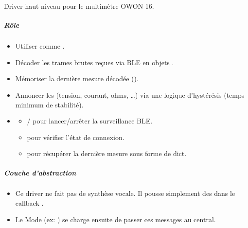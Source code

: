 \documentclass[letterpaper,10pt,french]{sphinxmanual}
\begin{document}
\begin{fulllineitems}
\sphinxAtStartPar
Driver haut niveau pour le multimètre OWON 16.


\subparagraph{Rôle}
\label{\detokenize{api/hardware.devices:role}}\begin{itemize}
\item {} 
\sphinxAtStartPar
Utiliser  comme .

\item {} 
\sphinxAtStartPar
Décoder les trames brutes reçues via BLE en objets .

\item {} 
\sphinxAtStartPar
Mémoriser la dernière mesure décodée ().

\item {} 
\sphinxAtStartPar
Annoncer les  (tension, courant, ohms, …)
via une logique d’hystérésis (temps minimum de stabilité).

\item {} \begin{description}
\begin{itemize}
\item {} 
\sphinxAtStartPar
{} /  pour lancer/arrêter la surveillance BLE.

\item {} 
\sphinxAtStartPar
{} pour vérifier l’état de connexion.

\item {} 
\sphinxAtStartPar
{} pour récupérer la dernière mesure sous forme de dict.

\end{itemize}

\end{description}

\end{itemize}


\subparagraph{Couche d’abstraction}
\label{\detokenize{api/hardware.devices:couche-dabstraction}}\begin{itemize}
\item {} 
\sphinxAtStartPar
Ce driver ne fait pas de synthèse vocale.
Il pousse simplement des  dans le callback .

\item {} 
\sphinxAtStartPar
Le Mode (ex: ) se charge ensuite de passer ces messages
au  central.


\end{itemize}
\end{fulllineitems}
\end{document}
